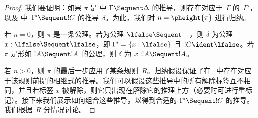 \documentclass[../../../include/open-logic-section]{subfiles}
\begin{document}
\begin{proof}
  我们要证明：如果 $\pi$ 是  中 $\Gamma \Sequent \Delta$ 的推导，则存在对应于~$\Gamma$ 的~$\Gamma'$，以及  中~$\Gamma' \Sequent !C$ 的推导~$\delta$。为此，我们对 $n = \pheight{\pi}$ 进行归纳。

  若 $n = 0$，则 $\pi$ 是一条公理。若为公理 $\lfalse \Sequent \quad$，则 $\delta$ 为公理 $x:\lfalse \Sequent \lfalse$，即 $\Gamma' = \{x:\lfalse\}$ 且 $!C \ident \lfalse$。若 $\pi$ 是形如 $!A \Sequent !A$ 的公理，则 $\delta$ 为 $x: !A \Sequent !A$。

  若 $n>0$，则 $\pi$ 的最后一步应用了某条规则~$R$。归纳假设保证了在~ 中存在对应于该规则前提的相继式的推导。我们可以假设这些推导中的所有解除标签互不相同，并且若标签 $x$ 被解除，则它只出现在解除它的推理上方（必要时可进行重标记）。接下来我们展示如何组合这些推导，以得到合适的 $\Gamma' \Sequent !C$ 的推导。我们根据~$R$ 分情况讨论。


\end{proof}
\end{document}
